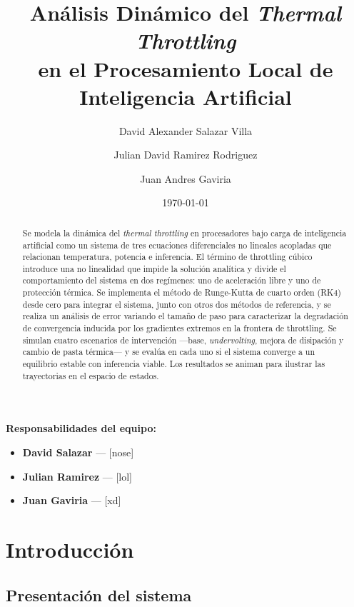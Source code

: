 \documentclass[10pt, twocolumn]{article}
\title{\textbf{Análisis Dinámico del \emph{Thermal Throttling}\\
       en el Procesamiento Local de Inteligencia Artificial}}
\author{%
  David  Alexander Salazar Villa \and Julian David Ramirez Rodriguez \and Juan Andres Gaviria 
}
\date{\today}
\begin{document}
\maketitle

\noindent\textbf{Responsabilidades del equipo:}
\begin{itemize}
  \item \textbf{David  Salazar } — [nose]
  \item \textbf{Julian Ramirez} — [lol]
  \item \textbf{Juan Gaviria} — [xd]
\end{itemize}

\begin{abstract}
Se modela la dinámica del \emph{thermal throttling} en procesadores bajo carga
de inteligencia artificial como un sistema de tres ecuaciones diferenciales no
lineales acopladas que relacionan temperatura, potencia e inferencia. El término
de throttling cúbico introduce una no linealidad que impide la solución analítica
y divide el comportamiento del sistema en dos regímenes: uno de aceleración libre
y uno de protección térmica. Se implementa el método de Runge-Kutta de cuarto
orden (RK4) desde cero para integrar el sistema, junto con otros dos métodos de
referencia, y se realiza un análisis de error variando el tamaño de paso para
caracterizar la degradación de convergencia inducida por los gradientes extremos
en la frontera de throttling. Se simulan cuatro escenarios de intervención
---base, \emph{undervolting}, mejora de disipación y cambio de pasta
térmica--- y se evalúa en cada uno si el sistema converge a un equilibrio estable
con inferencia viable. Los resultados se animan para ilustrar las trayectorias en
el espacio de estados.
\end{abstract}

\section{Introducción}

\subsection{Presentación del sistema}
\end{document}
